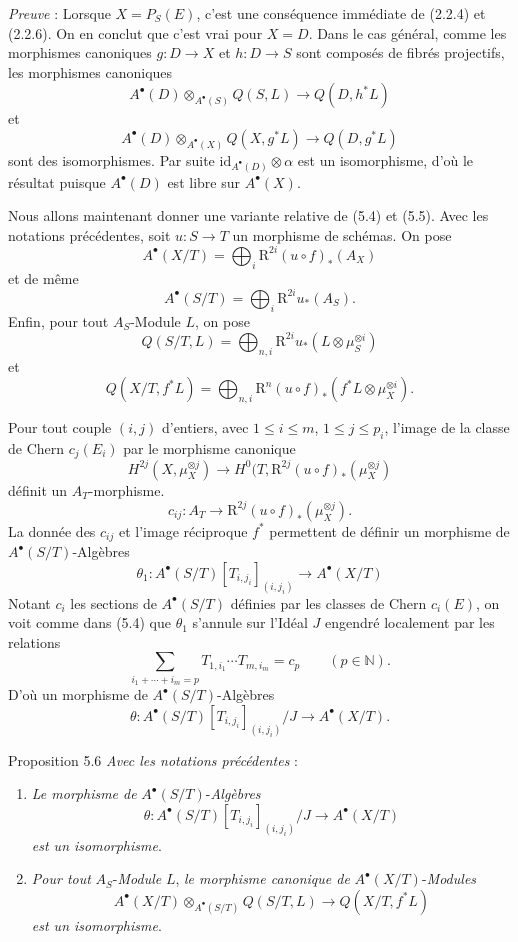 \emph{Preuve} : Lorsque $X=P_S(E)$, c'est une conséquence immédiate de (2.2.4) et (2.2.6). On en conclut que c'est vrai pour $X=D$. Dans le cas général, comme les morphismes canoniques $g:D\to X$ et $h:D\to S$ sont composés de fibrés projectifs, les morphismes canoniques
\[
A^\bullet(D)\otimes_{A^\bullet(S)}Q(S,L)\to Q(D,h^*L)
\]
et
\[
A^\bullet(D)\otimes_{A^\bullet(X)}Q(X,g^*L)\to Q(D,g^*L)
\]
sont des isomorphismes. Par suite $\mathrm{id}_{A^\bullet(D)}\otimes\alpha$ est un isomorphisme, d'où le résultat puisque $A^\bullet(D)$ est libre sur $A^\bullet(X)$.

Nous allons maintenant donner une variante relative de (5.4) et (5.5). Avec les notations précédentes, soit $u:S\to T$ un morphisme de schémas. On pose
\[
A^\bullet(X/T)=\bigoplus_i \mathrm{R}^{2i}(u\circ f)_*(A_X)
\]
et de même
\[
A^\bullet(S/T)=\bigoplus_i \mathrm{R}^{2i}u_*(A_S).
\]
Enfin, pour tout $A_S$-Module $L$, on pose
\[
Q(S/T,L)=\bigoplus_{n,i}\mathrm{R}^{2i} u_*(L\otimes\mu_S^{\otimes i})
\]
et
\[
Q(X/T,f^*L)=\bigoplus_{n,i}\mathrm{R}^n(u\circ f)_*(f^*L\otimes\mu_X^{\otimes i}).
\]

Pour tout couple $(i,j)$ d'entiers, avec $1\le i\le m$, $1\le j\le p_i$, l'image de la classe de Chern $c_j(E_i)$ par le morphisme canonique
\[
H^{2j}(X,\mu_X^{\otimes j})
\to H^0(T,\mathrm{R}^{2j}(u\circ f)_*(\mu_X^{\otimes j})
\]
définit un $A_T$-morphisme.
\[
c_{ij}:A_T\to \mathrm{R}^{2j}(u\circ f)_*(\mu_X^{\otimes j}).
\]
La donnée des $c_{ij}$ et l'image réciproque $f^*$ permettent de définir un morphisme de $A^\bullet(S/T)$-Algèbres
\[
\theta_1:A^\bullet(S/T)[T_{i,j_i}]_{(i,j_i)}\to A^\bullet(X/T)
\]
Notant $c_i$ les sections de $A^\bullet(S/T)$ définies par les classes de Chern $c_i(E)$, on voit comme dans (5.4) que $\theta_1$ s'annule sur l'Idéal $J$ engendré localement par les relations
\[
\sum_{i_1+\cdots+i_m=p}T_{1,i_1}\cdots T_{m,i_m}=c_p\qquad(p\in\mathbb{N}).
\]
D'où un morphisme de $A^\bullet(S/T)$-Algèbres
\[
\theta:A^\bullet(S/T)[T_{i,j_i}]_{(i,j_i)}/J\to A^\bullet(X/T).
\]

\begin{statement}{Proposition 5.6}
\emph{Avec les notations précédentes} :
\begin{enumerate}[label=\alph*)]
\item \emph{Le morphisme de} $A^\bullet(S/T)$-\emph{Algèbres}
\[
\theta:A^\bullet(S/T)[T_{i,j_i}]_{(i,j_i)}/J\to A^\bullet(X/T)
\]
\emph{est un isomorphisme}.
\item \emph{Pour tout} $A_S$-\emph{Module} $L$, \emph{le morphisme canonique de} $A^\bullet(X/T)$-\emph{Modules}
\[
A^\bullet(X/T)\otimes_{A^\bullet(S/T)}Q(S/T,L)\to Q(X/T,f^*L)
\]
\emph{est un isomorphisme}.
\end{enumerate}
\end{statement}

